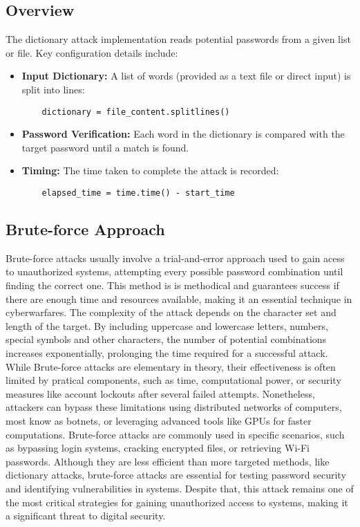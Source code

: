 \documentclass{comjnl}
\begin{document}
\subsection*{Overview}
The dictionary attack implementation reads potential passwords from a given list or file. Key configuration details include:
\begin{itemize}
    \item \textbf{Input Dictionary:} A list of words (provided as a text file or direct input) is split into lines:
    \begin{verbatim}
    dictionary = file_content.splitlines()
    \end{verbatim}
    \item \textbf{Password Verification:} Each word in the dictionary is compared with the target password until a match is found.
    \item \textbf{Timing:} The time taken to complete the attack is recorded:
    \begin{verbatim}
    elapsed_time = time.time() - start_time
    \end{verbatim}
\end{itemize}

\subsection{Brute-force Approach}
Brute-force attacks usually involve a trial-and-error approach used to gain acess to unauthorized systems, attempting every possible password combination until finding the correct one. This method is  is methodical and guarantees success if there are enough time and resources available, making it an essential technique in cyberwarfares. The complexity of the attack depends on the character set and length of the target. By including uppercase and lowercase letters, numbers, special symbols and other characters, the number of potential combinations increases exponentially, prolonging the time required for a successful attack.  While Brute-force attacks are elementary in theory, their effectiveness is often limited by pratical components, such as time, computational power, or security measures like account lockouts after several failed attempts. Nonetheless, attackers can bypass these limitations using distributed networks of computers, most know as botnets, or leveraging advanced tools like GPUs for faster computations. Brute-force attacks are commonly used in specific scenarios, such as bypassing login systems, cracking encrypted files, or retrieving Wi-Fi passwords. Although they are less efficient than more targeted methods, like dictionary attacks, brute-force attacks are essential for testing password security and identifying vulnerabilities in systems. Despite that, this attack remains one of the most critical strategies for gaining unauthorized access to systems, making it a significant threat to digital security.
\end{document}

